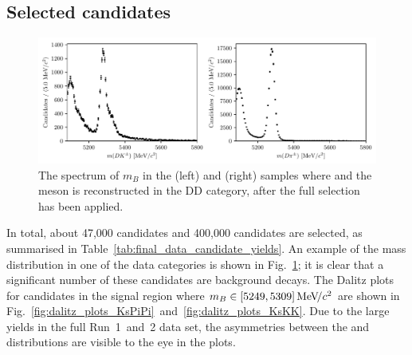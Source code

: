
\subsection{Selected candidates} %
\label{sub:selected_candidates}



\begin{figure}[tbp]
    \centering
    \includegraphics[width=\columnwidth]{figures/analysis/pretty_data_d2kspp_DD.pdf}
    \caption{The spectrum of $m_B$ in the (left) \BtoDK and (right) \BtoDpi samples where \DtoKspipi and the \KS meson is reconstructed in the DD category, after the full selection has been applied.}
    \label{fig:data_spectrum}
\end{figure}

In total, about 47,000 \BtoDK candidates and 400,000 \BtoDpi candidates are selected, as summarised in Table~\ref{tab:final_data_candidate_yields}. An example of the \B mass distribution in one of the data categories is shown in Fig.~\ref{fig:data_spectrum}; it is clear that a significant number of these candidates are background decays. The Dalitz plots for candidates in the signal region where $m_B\in[5249, 5309]\text{\,Me\kern -0.1em V\!/}c^2$ are shown in Fig.~\ref{fig:dalitz_plots_KsPiPi}~and~\ref{fig:dalitz_plots_KsKK}. Due to the large yields in the full Run~1~and~2 \lhcb data set, the asymmetries between the \Bp and \Bm distributions are visible to the eye in the \BtoDK plots.

